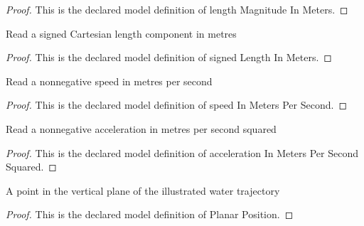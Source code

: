 \begin{proof}
  This is the declared model definition of length Magnitude In Meters.
\end{proof}
\begin{definition}
  \label{def:physics:phyx-mini-0683:phyxminiproblems-problemphyxmini0683-signedlengthinmeters}
  Read a signed Cartesian length component in metres
\end{definition}
\begin{proof}
  This is the declared model definition of signed Length In Meters.
\end{proof}
\begin{definition}
  \label{def:physics:phyx-mini-0683:phyxminiproblems-problemphyxmini0683-speedinmeterspersecond}
  Read a nonnegative speed in metres per second
\end{definition}
\begin{proof}
  This is the declared model definition of speed In Meters Per Second.
\end{proof}
\begin{definition}
  \label{def:physics:phyx-mini-0683:phyxminiproblems-problemphyxmini0683-accelerationinmeterspersecondsquared}
  Read a nonnegative acceleration in metres per second squared
\end{definition}
\begin{proof}
  This is the declared model definition of acceleration In Meters Per Second Squared.
\end{proof}
\begin{definition}
  \label{def:physics:phyx-mini-0683:phyxminiproblems-problemphyxmini0683-planarposition}
  A point in the vertical plane of the illustrated water trajectory
\end{definition}
\begin{proof}
  This is the declared model definition of Planar Position.
\end{proof}
